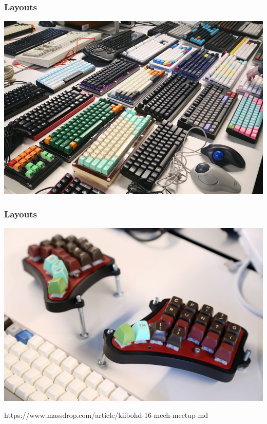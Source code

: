 \documentclass{beamer}
\begin{document}
\begin{frame}
  \frametitle{Layouts}
  \includegraphics[scale=0.4]{images/options}
\end{frame}

\begin{frame}
  \frametitle{Layouts}
  \includegraphics[scale=0.2]{images/custom-layout}

  \tiny https://www.massdrop.com/article/kiibohd-16-mech-meetup-md
\end{frame}

\end{document}
